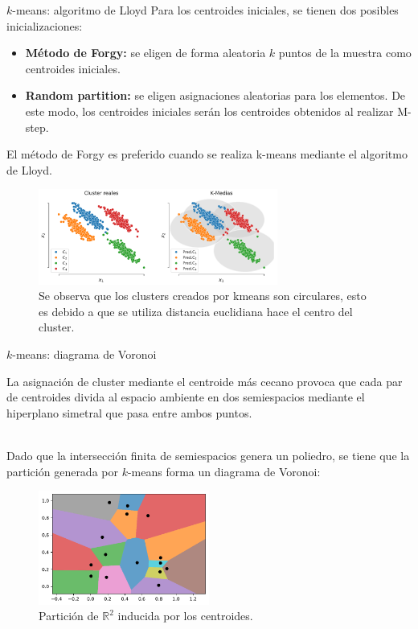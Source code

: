 \documentclass[handout, 9pt]{beamer}
\begin{document}
\begin{frame}{$k$-means: algoritmo de Lloyd}
	Para los centroides iniciales, se tienen dos posibles inicializaciones:

\begin{itemize}
	\item \textbf{Método de Forgy:} se eligen de forma aleatoria $k$ puntos de la muestra como centroides iniciales.\pause
	\item \textbf{Random partition:} se eligen asignaciones aleatorias para los elementos. De este modo, los centroides iniciales serán los centroides obtenidos al realizar M-step.\pause
\end{itemize}

El método de Forgy es preferido cuando se realiza k-means mediante el algoritmo de Lloyd.\pause

\begin{figure}[h]
  \centering
  \includegraphics[width=0.7\textwidth]{../../img/cap6_k_medias}
  \caption{Se observa que los clusters creados por kmeans son circulares, esto es debido a que se utiliza distancia euclidiana hace el centro del cluster.}
  \label{fig:kmeans}
\end{figure}

\end{frame}


\begin{frame}{$k$-means: diagrama de Voronoi}
	
La asignación de cluster mediante el centroide más cecano provoca que cada par de centroides divida al espacio ambiente en dos semiespacios mediante el hiperplano simetral que pasa entre ambos puntos. \\~\ \pause

Dado que la intersección finita de semiespacios genera un poliedro, se tiene que la partición generada por $k$-means forma un diagrama de Voronoi:

\begin{figure}[h]
  \centering
  \includegraphics[width=0.5\textwidth]{../../img/cap6_voronoi}
  \caption{Partición de $\mathbb{R}^2$ inducida por los centroides.}
  \label{fig:kmeans_voronoi}
\end{figure}

\end{frame}
\end{document}
